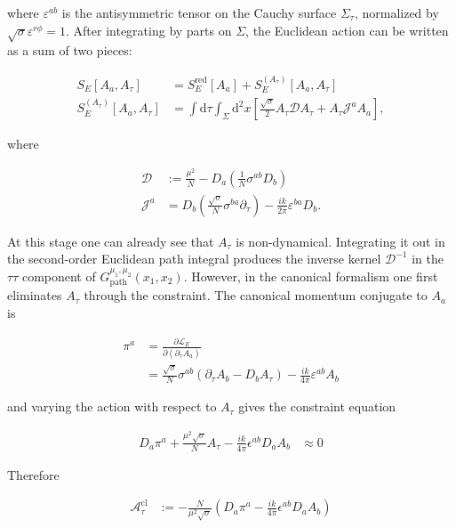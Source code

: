 where $\varepsilon ^{ab}$ is the antisymmetric tensor on the Cauchy surface $\displaystyle{\Sigma _{\tau}}$, normalized by $\sqrt{ \sigma }\varepsilon ^{r\phi}=1$. After integrating by parts on $\Sigma$, the Euclidean action can be written as a sum of two pieces:

\begin{align}
S_{E}[A_{a},A_{\tau}] & =S_{E}^{\mathrm{red}}[A_{a}]+S_{E}^{(A_{\tau})}[A_{a},A_{\tau}] \\
S_{E}^{(A_{\tau})}[A_{a},A_{\tau}] & =\int \mathrm{d}\tau \int _{\Sigma}\mathrm{d}^{2}x\left[\frac{\sqrt{ \sigma }}{2}A_{\tau}\mathcal{D}A_{\tau}+A_{\tau}\mathcal{J}^{a}A_{a}\right],
\end{align}

where

\begin{align}
\mathcal{D} & :=\frac{\mu ^{2}}{N}-D_{a}\left(\frac{1}{N}\sigma ^{ab}D_{b}\right) \\
\mathcal{J}^{a} & =D_{b}\left(\frac{\sqrt{ \sigma }}{N}\sigma ^{ba}\partial _{\tau}\right)-\frac{ik}{2\pi}\varepsilon ^{ba}D_{b}.
\end{align}

At this stage one can already see that $A_{\tau}$ is non-dynamical. Integrating it out in the second-order Euclidean path integral produces the inverse kernel $\mathcal{D}^{-1}$ in the $\tau\tau$ component of $G_{\mathrm{path}}^{\mu_{1},\mu_{2}}(x_{1},x_{2})$. However, in the canonical formalism one first eliminates $A_{\tau}$ through the constraint. The canonical momentum conjugate to $A_{a}$ is

\begin{align}
\pi ^{a} & =\frac{\partial \mathcal{L}_{E}}{\partial(\partial _{\tau}A_{a})} \\
 & =\frac{\sqrt{ \sigma }}{N}\sigma ^{ab}(\partial _{\tau}A_{b}-D_{b}A_{\tau})-\frac{ik}{4\pi}\varepsilon ^{ab}A_{b}
\end{align}

and varying the action with respect to $A_{\tau}$ gives the constraint equation

\begin{align}
D_{a}\pi ^{a}+\frac{\mu ^{2}\sqrt{ \sigma }}{N}A_{\tau}-\frac{ik}{4\pi}\epsilon ^{ab}D_{a}A_{b} & \approx0
\end{align}

Therefore

\begin{align}
\mathcal{A}_{\tau}^{\mathrm{cl}} & :=-\frac{N}{\mu ^{2}\sqrt{ \sigma }}\left( D_{a}\pi ^{a}-\frac{ik}{4\pi}\epsilon ^{ab}D_{a}A_{b} \right)
\end{align}

